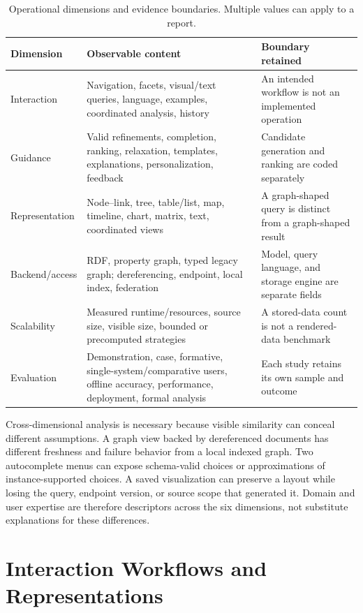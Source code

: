 \documentclass[manuscript,review,screen]{acmart}
\begin{document}
\begin{table}[htbp]
\centering\small
\caption{Operational dimensions and evidence boundaries. Multiple values can apply to a report.}
\label{tab:taxonomy}
\begin{tabularx}{\linewidth}{L{28mm} Y Y}
\toprule Dimension & Observable content & Boundary retained\\\midrule
Interaction & Navigation, facets, visual/text queries, language, examples, coordinated analysis, history & An intended workflow is not an implemented operation\\
Guidance & Valid refinements, completion, ranking, relaxation, templates, explanations, personalization, feedback & Candidate generation and ranking are coded separately\\
Representation & Node--link, tree, table/list, map, timeline, chart, matrix, text, coordinated views & A graph-shaped query is distinct from a graph-shaped result\\
Backend/access & RDF, property graph, typed legacy graph; dereferencing, endpoint, local index, federation & Model, query language, and storage engine are separate fields\\
Scalability & Measured runtime/resources, source size, visible size, bounded or precomputed strategies & A stored-data count is not a rendered-data benchmark\\
Evaluation & Demonstration, case, formative, single-system/comparative users, offline accuracy, performance, deployment, formal analysis & Each study retains its own sample and outcome\\\bottomrule
\end{tabularx}
\end{table}

Cross-dimensional analysis is necessary because visible similarity can conceal different assumptions. A graph view backed by dereferenced documents has different freshness and failure behavior from a local indexed graph. Two autocomplete menus can expose schema-valid choices or approximations of instance-supported choices. A saved visualization can preserve a layout while losing the query, endpoint version, or source scope that generated it. Domain and user expertise are therefore descriptors across the six dimensions, not substitute explanations for these differences.

\section{Interaction Workflows and Representations}
\end{document}
